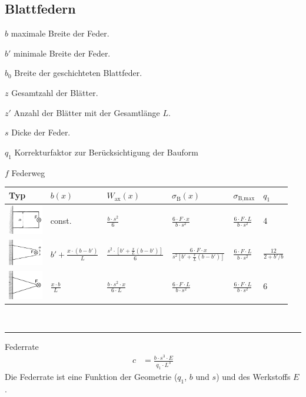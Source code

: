\pagebreak

\subsection{Blattfedern}
\begin{vardef}
	\item[$b$] maximale Breite der Feder.
	\item[$b'$] minimale Breite der Feder.
	\item[$b_0$] Breite der geschichteten Blattfeder.
	\item[$z$] Gesamtzahl der Blätter.
	\item[$z'$] Anzahl der Blätter mit der Gesamtlänge $L$.
	\item[$s$] Dicke der Feder.
	\item[$q_1$] Korrekturfaktor zur Berücksichtigung der Bauform
	\item[$f$] Federweg
\end{vardef}

\begin{tabularx}{\textwidth}{m{15mm}m{17mm}m{20mm}m{20mm}XX}
    \toprule
		Typ & $b(x)$ & $W_\text{ax}(x)$ & $\sigma_\text{B}(x)$ & $\sigma_\text{B,max}$ & $q_1$ \\ \midrule
		\includegraphics[width=15mm]{federn/blattfedern-rechteck} & const. & $\frac{b\cdot s^2}{6}$ & $\frac{6\cdot F \cdot x}{b\cdot s^2}$ & $\frac{6\cdot F \cdot L}{b \cdot s^2}$ & 4\\
		\includegraphics[width=15mm]{federn/blattfedern-trapez} & $b'+\frac{x \cdot (b-b')}{L}$ & $\frac{s^2\cdot [b'+\frac{x}{L}(b-b')]}{6}$ & $\frac{6\cdot F \cdot x}{s^2[b'+\frac{x}{L}(b-b')]}$ & $\frac{6\cdot F \cdot L}{b \cdot s^2}$ & $\frac{12}{2+b'/b}$\\
		\includegraphics[width=15mm]{federn/blattfedern-dreieck} & $\frac{x \cdot b}{L}$ & $\frac{b\cdot s^2 \cdot x}{6\cdot L}$ & $\frac{6\cdot F \cdot L}{b\cdot s^2}$ & $\frac{6\cdot F \cdot L}{b \cdot s^2}$ & 6\\
    \bottomrule
\end{tabularx}
\\[10pt]
\hrule
\begin{eeqn}{Federrate}
	\begin{align}
		c &= \frac{b\cdot s^3 \cdot E}{q_1 \cdot L^3}
	\end{align}
	Die Federrate ist eine Funktion der Geometrie ($q_1$, $b$ und $s$) und des Werkstoffs $E$.
\end{eeqn}

